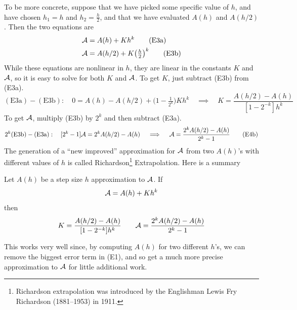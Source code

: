 To be more concrete, suppose that we have picked some specific value of $h$, and
have chosen $h_1=h$ and $h_2=\tfrac{h}{2}$, and that we have evaluated
$A(h)$ and $A(h/2)$. Then the two equations are
\begin{align*}
\mathcal{A}&=A(h)+Kh^k \tag{E3a}\\
\mathcal{A}&=A(h/2)+K\big(\tfrac{h}{2}\big)^k \tag{E3b}
\end{align*}
While these equations are nonlinear in $h$, they are linear in the constants $K$
and $\mathcal{A}$, so it is easy to solve for both $K$ and $\mathcal{A}$. To get $K$, just 
subtract (E3b) from (E3a).
\begin{equation*}
(\textrm{E3a})-(\textrm{E3b}):\quad
0=A(h)-A(h/2) +\big(1-\tfrac{1}{2^k}\big)Kh^k
\quad\implies\quad
K=\frac{A(h/2)-A(h)}{[1-2^{-k}]h^k}
\tag{E4a}\end{equation*}
To get $\mathcal{A}$, multiply (E3b) by $2^k$ and then
subtract (E3a).
\begin{equation*}
2^k(\textrm{E3b})-(\textrm{E3a}):\quad
[2^k-1]\mathcal{A}=2^kA(h/2)-A(h)
\quad\implies\quad
\mathcal{A}=\frac{2^kA(h/2)-A(h)}{2^k-1}
\tag{E4b}\end{equation*}
The generation of a ``new improved'' approximation
for $\mathcal{A}$ from two $A(h)$'s with different values of $h$ is called 
Richardson\footnote{Richardson extrapolation
was introduced by the Englishman Lewis Fry Richardson
(1881--1953) in 1911.}
Extrapolation. Here is a summary
\begin{impeqn}\label{eq:Richardson}
Let $A(h)$ be a step size $h$ approximation to $\mathcal{A}$. If
\begin{equation*}
\mathcal{A}=A(h)+K h^k
\end{equation*}
then
\begin{align*}
K=\frac{A(h/2)-A(h)}{[1-2^{-k}]h^k}\qquad
\mathcal{A}=\frac{2^kA(h/2)-A(h)}{2^k-1}
\end{align*}
\end{impeqn}

This works very well since, by computing $A(h)$ for two different $h$'s, 
we can remove the biggest error term in (E1), and so get a much more precise approximation to $\mathcal{A}$ for little additional work.

